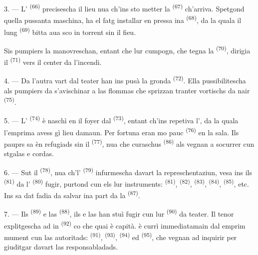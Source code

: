 3. --- L' \textsuperscript{(66)} precisescha il lieu nua ch'ins sto
metter la  \textsuperscript{(67)} ch'arriva. Spetgond quella pussanta
maschina, ha el fatg installar en pressa ina  \textsuperscript{(68)},
da la quala il lung  \textsuperscript{(69)} bitta aua sco in torrent sin il
fieu.

Sis pumpiers la manovreschan, entant che lur cumpogn, che tegna la 
\textsuperscript{(70)}, dirigia il  \textsuperscript{(71)} vers il center da
l'incendi.

4. --- Da l'autra vart dal teater han ins pusà la gronda 
\textsuperscript{(72)}. Ella pussibilitescha als pumpiers da s'avischinar a las flommas
che sprizzan tranter vortischs da nair  \textsuperscript{(75)}.

\VUsaut{5.0mm}
\VUsaut{3.4mm}

5. --- L' \textsuperscript{(74)} è naschì en il foyer dal 
\textsuperscript{(73)}, entant ch'ins repetiva l', da la quala l'emprima
 avess gì lieu damaun. Per fortuna eran mo pauc
 \textsuperscript{(76)} en la sala. Ils pauprs sa èn refugiads sin il
 \textsuperscript{(77)}, nua che curaschus 
\textsuperscript{(86)} als vegnan a socurrer cun stgalas e cordas.

6. --- Sut il  \textsuperscript{(78)}, nua ch'l'
\textsuperscript{(79)} infurmescha davart la represchentaziun, vesa ins ils
 \textsuperscript{(81)} da l' \textsuperscript{(80)} fugir,
purtond cun els lur instruments:  \textsuperscript{(81)}, 
\textsuperscript{(82)},  \textsuperscript{(83)}, 
\textsuperscript{(84)},  \textsuperscript{(85)}, etc. Ins sa dat fadia da
salvar ina part da la  \textsuperscript{(87)}.

7. --- Ils  \textsuperscript{(89)} e las 
\textsuperscript{(88)}, ils  e las  han stuì fugir cun
lur  \textsuperscript{(90)} da teater. Il tenor explitgescha ad in
 \textsuperscript{(92)} co che quai è capità.  è
currì immediatamain dal emprim mument cun las autoritads: 
\textsuperscript{(91)},  \textsuperscript{(93)}, 
\textsuperscript{(94)} ed  \textsuperscript{(95)}, che vegnan
ad inquirir per giuditgar davart las responsabladads.

\VUsaut{6.0mm}
\VUfilet{22mm}
